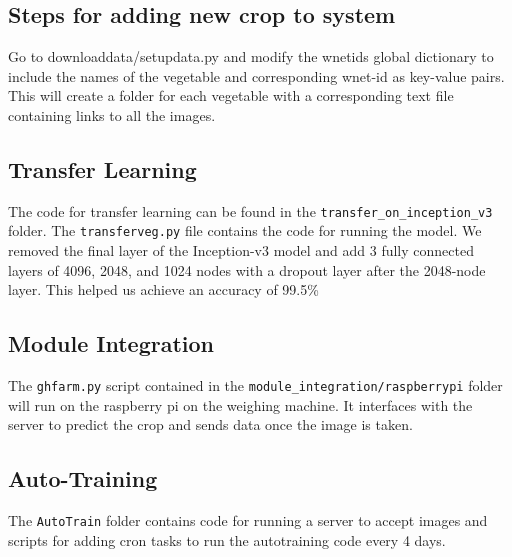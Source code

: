 \documentclass[a4paper,12pt,oneside]{book}
\begin{document}
\subsection{Steps for adding new crop to system}
Go to download\textunderscore data/setupdata.py and modify the wnetids global dictionary to include the names of the vegetable and corresponding wnet-id as key-value pairs. This will create a folder for each vegetable with a corresponding text file containing links to all the images.

\subsection{Transfer Learning}
The code for transfer learning can be found in the \texttt{transfer\_on\_inception\_v3} folder. The \texttt{transferveg.py} file contains the code for running the model.
We removed the final layer of the Inception-v3 model and add 3 fully connected layers of 4096, 2048, and 1024 nodes with a dropout layer after the 2048-node layer.
This helped us achieve an accuracy of 99.5\%

\subsection{Module Integration}
The \texttt{ghfarm.py} script contained in the \texttt{module\_integration/raspberrypi} folder will run on the raspberry pi on the weighing machine. It interfaces with the server to predict the crop and sends data once the image is taken.

\subsection{Auto-Training}
The \texttt{AutoTrain} folder contains code for running a server to accept images and scripts for adding cron tasks to run the autotraining code every 4 days.
\end{document}
